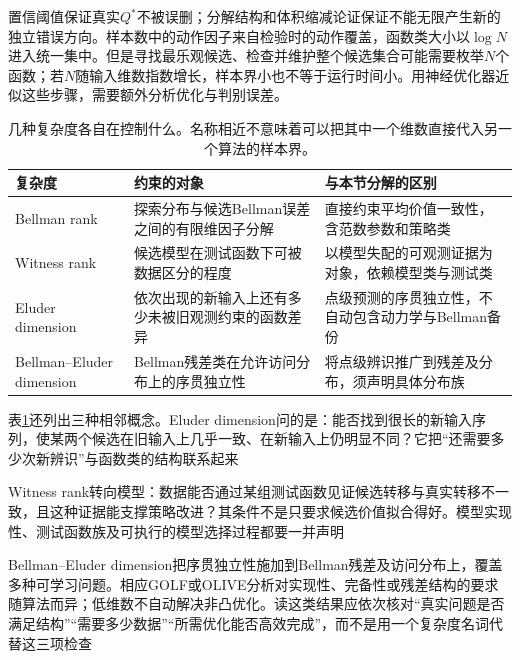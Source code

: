 置信阈值保证真实$Q^*$不被误删；分解结构和体积缩减论证保证不能无限产生新的独立错误方向。样本数中的动作因子来自检验时的动作覆盖，函数类大小以$\log N$进入统一集中。但是寻找最乐观候选、检查并维护整个候选集合可能需要枚举$N$个函数；若$N$随输入维数指数增长，样本界小也不等于运行时间小。用神经优化器近似这些步骤，需要额外分析优化与判别误差。

\begin{table}[t]
  \centering
  \small
  \begin{tabularx}{\linewidth}{>{\raggedright\arraybackslash}p{28mm} >{\raggedright\arraybackslash}X >{\raggedright\arraybackslash}X}
    \toprule
    复杂度 & 约束的对象 & 与本节分解的区别 \\
    \midrule
    Bellman rank & 探索分布与候选Bellman误差之间的有限维因子分解 & 直接约束平均价值一致性，含范数参数和策略类 \\
    Witness rank & 候选模型在测试函数下可被数据区分的程度 & 以模型失配的可观测证据为对象，依赖模型类与测试类 \\
    Eluder dimension & 依次出现的新输入上还有多少未被旧观测约束的函数差异 & 点级预测的序贯独立性，不自动包含动力学与Bellman备份 \\
    Bellman--Eluder dimension & Bellman残差类在允许访问分布上的序贯独立性 & 将点级辨识推广到残差及分布，须声明具体分布族 \\
    \bottomrule
  \end{tabularx}
  \caption{几种复杂度各自在控制什么。名称相近不意味着可以把其中一个维数直接代入另一个算法的样本界。}
  \label{tab:rl-learning-function-complexities}
\end{table}

表\ref{tab:rl-learning-function-complexities}还列出三种相邻概念。Eluder dimension问的是：能否找到很长的新输入序列，使某两个候选在旧输入上几乎一致、在新输入上仍明显不同？它把“还需要多少次新辨识”与函数类的结构联系起来

Witness rank转向模型：数据能否通过某组测试函数见证候选转移与真实转移不一致，且这种证据能支撑策略改进？其条件不是只要求候选价值拟合得好。模型实现性、测试函数族及可执行的模型选择过程都要一并声明

Bellman--Eluder dimension把序贯独立性施加到Bellman残差及访问分布上，覆盖多种可学习问题。相应GOLF或OLIVE分析对实现性、完备性或残差结构的要求随算法而异；低维数不自动解决非凸优化。读这类结果应依次核对“真实问题是否满足结构”“需要多少数据”“所需优化能否高效完成”，而不是用一个复杂度名词代替这三项检查

